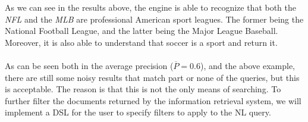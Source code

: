 As we can see in the results above, the engine is able to recognize that both the \textit{NFL} and the \textit{MLB} are professional American sport leagues.
The former being the National Football League, and the latter being the Major League Baseball.
Moreover, it is also able to understand that soccer is a sport and return it. \\ \\
As can be seen both in the average precision ($\overline{P} = 0.6$), and the above example, there are still some noisy results that match part or none of the queries, but this is acceptable.
The reason is that this is not the only means of searching.
To further filter the documents returned by the information retrieval system, we will implement a DSL for the user to specify filters to apply to the NL query.
